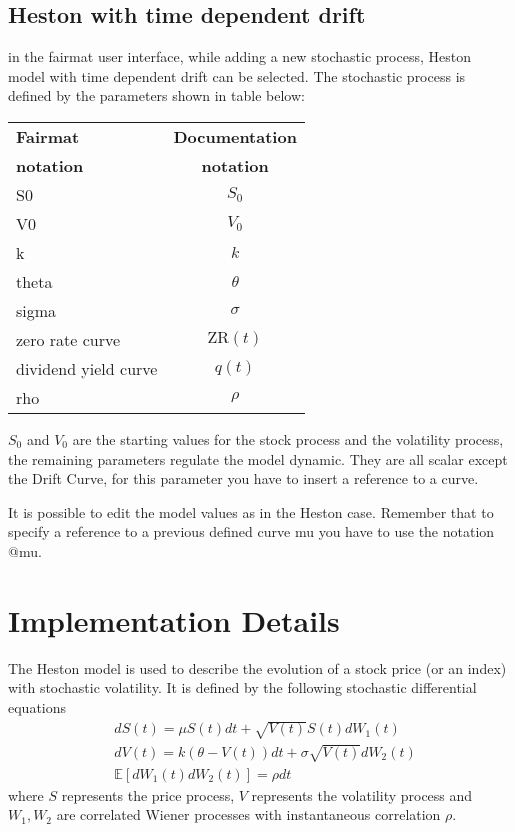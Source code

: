 \subsection{Heston with time dependent drift}
in the fairmat user interface, while adding a new stochastic process, Heston model with time dependent drift can be selected.
The stochastic process is defined by the parameters shown in table below:
\begin{center}
\begin{tabular}{|l|c|}
  \hline
\textbf{Fairmat}&\textbf{Documentation}\\
\textbf{notation}&\textbf{notation}\\
                     \hline
 S0     & $S_0$\\
 V0     & $V_0$\\
 k      & $k$ \\
 theta  & $\theta$\\
 sigma  & $\sigma$\\
 zero rate curve    & $\mathrm{ZR}(t)$\\
 dividend yield curve    & $q(t)$\\
rho & $\rho$ \\ 
   \hline
\end{tabular}
\end{center}
$S_0$ and $V_0$ are the starting values for the stock process and the volatility process, the remaining parameters regulate the model dynamic. They are all scalar except the Drift Curve, for this parameter you have to insert a reference to a curve.

It is possible to edit the model values as in the Heston case. Remember that to specify a reference to a previous defined curve {\ttfamily mu} you have to use the notation {\ttfamily @mu}.

\section{Implementation Details}

The Heston model is used to describe the evolution of a stock price (or an index) with stochastic volatility. It is defined by the following stochastic differential equations
\begin{align}
& dS(t) = \mu S(t)dt + \sqrt{V(t)}S(t)dW_1(t)\label{eq:dsh}\\
& dV(t) = k(\theta - V(t))dt + \sigma\sqrt{V(t)}dW_2(t)\\
& \mathbb{E}[dW_1(t)dW_2(t)] = \rho dt
\end{align}
where $S$ represents the price process, $V$ represents the volatility process and $W_1, W_2$ are correlated Wiener processes with instantaneous correlation $\rho$.

